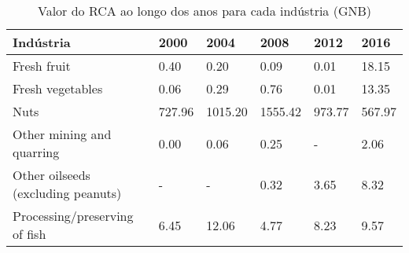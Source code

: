 \begin{table}
\centering
\caption{Valor do RCA ao longo dos anos para cada indústria (GNB)}
\label{tab:ex3-tempo-GNB}
\begin{tabular}{p{6cm}p{1.5cm}p{1.5cm}p{1.5cm}p{1.5cm}p{1.5cm}}
\toprule
                         Indústria &   2000 &    2004 &    2008 &   2012 &   2016 \\
\midrule
                       Fresh fruit &   0.40 &    0.20 &    0.09 &   0.01 &  18.15 \\
                  Fresh vegetables &   0.06 &    0.29 &    0.76 &   0.01 &  13.35 \\
                              Nuts & 727.96 & 1015.20 & 1555.42 & 973.77 & 567.97 \\
         Other mining and quarring &   0.00 &    0.06 &    0.25 &      - &   2.06 \\
Other oilseeds (excluding peanuts) &      - &       - &    0.32 &   3.65 &   8.32 \\
     Processing/preserving of fish &   6.45 &   12.06 &    4.77 &   8.23 &   9.57 \\
\bottomrule
\end{tabular}
\end{table}
